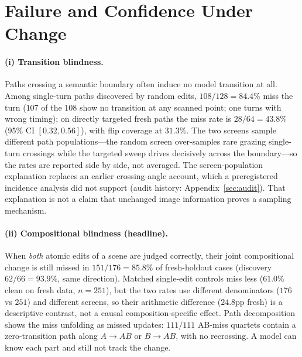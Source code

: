 \section{Failure and Confidence Under Change}
\label{sec:phenomenon}

\paragraph{(i) Transition blindness.} Paths crossing a semantic boundary
often induce no model transition at all. Among single-turn paths
discovered by random edits, $108/128 = 84.4\%$ miss the turn ($107$ of the
$108$ show no transition at any scanned point; one turns with wrong
timing); on directly targeted fresh paths the miss rate is $28/64 =
43.8\%$ (95\% CI $[0.32,0.56]$), with flip coverage at $31.3\%$. The two
screens sample different path populations---the random screen over-samples
rare grazing single-turn crossings while the targeted sweep drives
decisively across the boundary---so the rates are reported side by side,
not averaged. The screen-population explanation replaces an earlier
crossing-angle account, which a preregistered incidence analysis did not
support (audit history: Appendix~\ref{sec:audit}). That explanation is not
a claim that unchanged image information proves a sampling mechanism.

\paragraph{(ii) Compositional blindness (headline).} When \emph{both}
atomic edits of a scene are judged correctly, their joint compositional
change is still missed in $151/176 = 85.8\%$ of fresh-holdout cases
(discovery $62/66 = 93.9\%$, same direction). Matched single-edit controls
miss less ($61.0\%$ clean on fresh data, $n{=}251$), but the two rates use
different denominators ($176$ vs $251$) and different screens, so their
arithmetic difference ($24.8$pp fresh) is a descriptive contrast, not a
causal composition-specific effect. Path decomposition shows the miss
unfolding as missed updates: $111/111$ AB-miss quartets contain a
zero-transition path along $A \to AB$ or $B \to AB$, with no recrossing.
A model can know each part and still not track the change.

